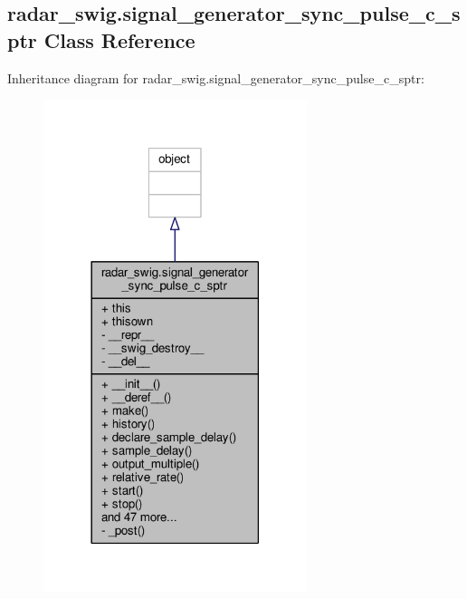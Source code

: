 \subsection{radar\+\_\+swig.\+signal\+\_\+generator\+\_\+sync\+\_\+pulse\+\_\+c\+\_\+sptr Class Reference}
\label{classradar__swig_1_1signal__generator__sync__pulse__c__sptr}


Inheritance diagram for radar\+\_\+swig.\+signal\+\_\+generator\+\_\+sync\+\_\+pulse\+\_\+c\+\_\+sptr\+:
\nopagebreak
\begin{figure}[H]
\begin{center}
\leavevmode
\includegraphics[width=218pt]{d6/db4/classradar__swig_1_1signal__generator__sync__pulse__c__sptr__inherit__graph}
\end{center}
\end{figure}


